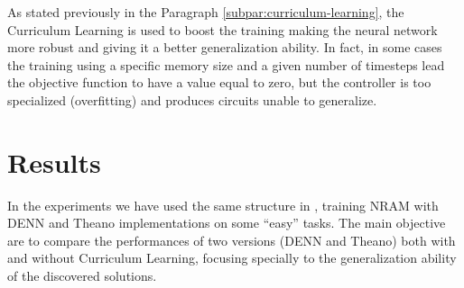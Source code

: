 As stated previously in the Paragraph \ref{subpar:curriculum-learning}, the Curriculum Learning is used to boost the training making the neural network more robust and giving it a better generalization ability. In fact, in some cases the training using a specific memory size and a given number of timesteps lead the objective function to have a value equal to zero, but the controller is too specialized (overfitting) and produces circuits unable to generalize.

\section{Results}
In the experiments we have used the same structure in \cite{NRAM:2016}, training NRAM with DENN and Theano implementations on some ``easy'' tasks. The main objective are to compare the performances of two versions (DENN and Theano) both with and without Curriculum Learning, focusing specially to the generalization ability of the discovered solutions.\newline
